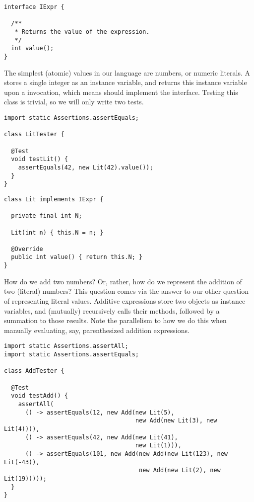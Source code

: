 \begin{lstlisting}[language=MyJava]
interface IExpr {

  /**
   * Returns the value of the expression.
   */
  int value();
}
\end{lstlisting}

The simplest (atomic) values in our language are numbers, or numeric literals. 
A  stores a single integer as an instance variable, and returns this instance variable upon a  invocation, which means  should implement the  interface. 
Testing this class is trivial, so we will only write two tests.

\begin{lstlisting}[language=MyJava]
import static Assertions.assertEquals;

class LitTester {

  @Test
  void testLit() {
    assertEquals(42, new Lit(42).value());
  }
}
\end{lstlisting}

\newpage %
\begin{lstlisting}[language=MyJava]
class Lit implements IExpr {

  private final int N;

  Lit(int n) { this.N = n; }

  @Override
  public int value() { return this.N; }
}
\end{lstlisting}

How do we add two numbers? 
Or, rather, how do we represent the addition of two (literal) numbers? 
This question comes via the answer to our other question of representing literal values. 
Additive expressions store two  objects as instance variables, and (mutually) recursively calls their  methods, followed by a summation to those results. 
Note the parallelism to how we do this when manually evaluating, say, parenthesized addition expressions.

\begin{lstlisting}[language=MyJava]
import static Assertions.assertAll;
import static Assertions.assertEquals;

class AddTester {

  @Test
  void testAdd() {
    assertAll(
      () -> assertEquals(12, new Add(new Lit(5), 
                                     new Add(new Lit(3), new Lit(4)))),
      () -> assertEquals(42, new Add(new Lit(41), 
                                     new Lit(1))),
      () -> assertEquals(101, new Add(new Add(new Lit(123), new Lit(-43)),
                                      new Add(new Lit(2), new Lit(19)))));
  }
}
\end{lstlisting}

